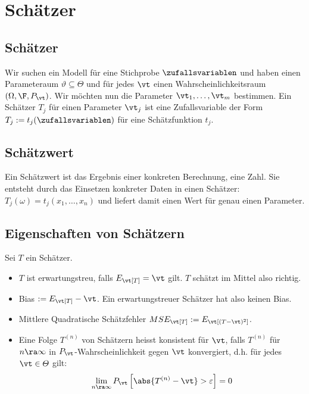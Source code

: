 \hypertarget{sec:3}{\section{Schätzer}}
\subsection*{Schätzer}
Wir suchen ein Modell für eine Stichprobe $\zufallsvariablen$ und haben einen
Parameteraum $\vartheta \subseteq \varTheta$ und für jedes $\vt$ einen
Wahrscheinlichkeitsraum $ (\Omega, \F, P_\vt)$. Wir möchten nun die Parameter
$\vt_1, \dots, \vt_m$ bestimmen. Ein Schätzer $T_j$ für einen Parameter $\vt_j$
ist eine Zufallsvariable der Form $T_j := t_j (\zufallsvariablen)$ für eine
Schätzfunktion $t_j$.
\subsection*{Schätzwert}
Ein Schätzwert ist das Ergebnis einer konkreten Berechnung, eine Zahl. Sie
entsteht durch das Einsetzen konkreter Daten in einen Schätzer: $T_j (\omega) =
  t_j (x_1, \dots, x_n)$ und liefert damit einen Wert für genau einen Parameter.
\subsection*{Eigenschaften von Schätzern}
Sei $T$ ein Schätzer.
\begin{itemize}
  \item $T$ ist erwartungstreu, falls $E_\vt[T] = \vt$ gilt. $T$ schätzt
        im Mittel also richtig.
  \item Bias $:= E_\vt[T] - \vt$. Ein erwartungstreuer Schätzer hat also keinen Bias.
  \item Mittlere Quadratische Schätzfehler $MSE_\vt[T] := E_\vt[ (T - \vt)^2]$.
  \item Eine Folge $T^{ (n)}$ von Schätzern heisst konsistent für $\vt$, falls $T^{
              (n)}$ für $n \ra \infty$ in $P_\vt$-Wahrscheinlichkeit gegen $\vt$ konvergiert,
        d.h. für jedes $\vt \in \varTheta$ gilt:
        \begin{align*}
          \lim_{n \ra \infty} P_\vt \left[ \abs{T^{ (n)} - \vt} > \varepsilon \right] = 0
        \end{align*}
\end{itemize}
